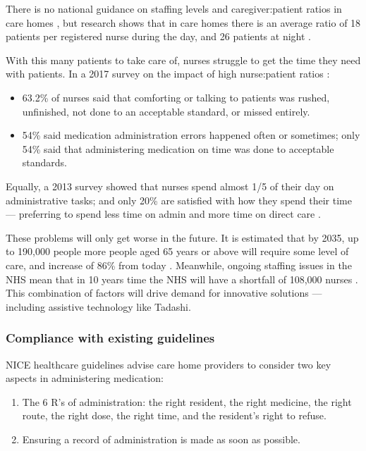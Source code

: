 \documentclass{article}
\begin{document}
There is no national guidance on staffing levels and caregiver:patient ratios in care homes \cite{rcnstaffingadvice}, but research shows that in care homes there is an average ratio of 18 patients per registered nurse during the day, and 26 patients at night \cite{rcnstaffingguidance}.

With this many patients to take care of, nurses struggle to get the time they need with patients. In a 2017 survey on the impact of high nurse:patient ratios \cite{unison}:
\begin{itemize}
\item 63.2\% of nurses said that comforting or talking to patients was rushed, unfinished, not done to an acceptable standard, or missed entirely. 
\item 54\% said medication administration errors happened often or sometimes; only 54\% said that administering medication on time was done to acceptable standards.
\end{itemize}

Equally, a 2013 survey showed that nurses spend almost 1/5 of their day on administrative tasks; and only 20\% are satisfied with how they spend their time --- preferring to spend less time on admin and more time on direct care \cite{rcnpol}.

These problems will only get worse in the future. It is estimated that by 2035, up to 190,000 people more people aged 65 years or above will require some level of care, and increase of 86\% from today \cite{lancet}. Meanwhile, ongoing staffing issues in the NHS mean that in 10 years time the NHS will have a shortfall of 108,000 nurses \cite{nuffield}. This combination of factors will drive demand for innovative solutions --- including assistive technology like Tadashi. 

\subsubsection{Compliance with existing guidelines}
NICE healthcare guidelines \cite{niceguidance} advise care home providers to consider two key aspects in administering medication:
\begin{enumerate}
\item The 6 R's of administration: the right resident, the right medicine, the right route, the right dose, the right time, and the resident's right to refuse. 
\item Ensuring a record of administration is made as soon as possible. 
\end{enumerate}
\end{document}

